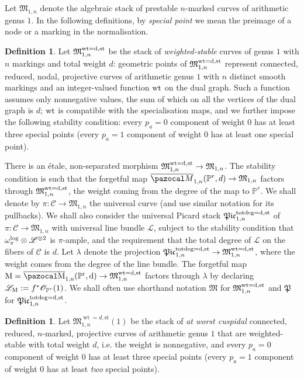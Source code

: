 \documentclass[11pt]{amsart}
\newcommand{\M}[4]{\overline{\pazocal M}_{#1,#2}(#3,#4)}
\newcommand{\PP}{\mathbb P}
\newcommand{\OO}{\mathcal O}
\renewcommand{\to}{\rightarrow}
\newcommand{\cC}{\mathcal C}
\newcommand{\MM}{\mathfrak M}
\newcommand{\PtoM}{\lambda}
\theoremstyle{plain}
\theoremstyle{definition}
\newtheorem{dfn}[thm]{Definition}
\begin{document}
Let $\MM_{1,n}$ denote the algebraic stack of prestable $n$-marked curves of arithmetic genus $1$. In the following definitions, by \emph{special point} we mean the preimage of a node or a marking in the normalisation.
\begin{dfn}
Let $\mathfrak M_{1,n}^{\rm{wt}=d,\rm{st}}$ be the stack of \emph{weighted-stable} curves of genus $1$ with $n$ markings and total weight $d$: geometric points of $\mathfrak M_{1,n}^{\rm{wt}=d,\rm{st}}$ represent connected, reduced, nodal, projective curves of arithmetic genus $1$ with $n$ distinct smooth markings and an integer-valued function $\rm{wt}$ on the dual graph. Such a function assumes only nonnegative values, the sum of which on all the vertices of the dual graph is $d$; $\rm{wt}$ is compatible with the specialisation maps, and we further impose the following stability condition: every $p_a=0$ component of weight $0$ has at least three special points (every $p_a=1$ component of weight $0$ has at least one special point).
\end{dfn}
There is an \'{e}tale, non-separated morphism $\mathfrak M_{1,n}^{\rm{wt}=d,\rm{st}}\to\mathfrak M_{1,n}$.
The stability condition is such that the forgetful map $\M{1}{n}{\PP^r}{d}\to\mathfrak M_{1,n}$ factors through $\mathfrak M_{1,n}^{\rm{wt}=d,\rm{st}}$, the weight coming from the degree of the map to $\PP^r$.
We shall denote by $\pi\colon \cC\to \MM_{1,n}$ the universal curve (and use similar notation for its pullbacks).
We shall also consider the universal Picard stack $\mathfrak{Pic}^{\rm{tot deg}=d,\rm{st}}_{1,n}$ of $\pi\colon \cC\to \MM_{1,n}$ with universal line bundle $\mathcal{L}$, subject to the stability condition that $\omega_\pi^{\rm{log}}\otimes\mathcal L^{\otimes 2}$ is $\pi$-ample, and the requirement that the total degree of $\mathcal L$ on the fibers of $\cC$ is $d$. Let $\PtoM$ denote the projection $\mathfrak{Pic}^{\rm{tot deg}=d,\rm{st}}_{1,n}\to \mathfrak M_{1,n}^{\rm{wt}=d,\rm{st}}$, where the weight comes from the degree of the line bundle. The forgetful map $\rm M=\M{1}{n}{\PP^r}{d}\to\mathfrak M_{1,n}^{\rm{wt}=d,\rm{st}}$ factors through $\PtoM$ by declaring $\mathcal L_{\rm M}:=f^*\OO_{\PP^r}(1)$. We shall often use shorthand notation $\MM$ for $\mathfrak M_{1,n}^{\rm{wt}=d,\rm{st}}$ and $\mathfrak P$ for $\mathfrak{Pic}^{\rm{tot deg}=d,\rm{st}}_{1,n}$.
\begin{dfn}
Let $\mathfrak M_{1,n}^{\operatorname{wt}=d,\text{st}}(1)$ be the stack of \emph{at worst cuspidal} connected, reduced, $n$-marked, projective curves of arithmetic genus $1$ that are weighted-stable with total weight $d$, i.e. the weight is nonnegative, and every $p_a=0$ component of weight $0$ has at least three special points (every $p_a=1$ component of weight $0$ has at least \emph{two} special points).
\end{dfn}
\end{document}
